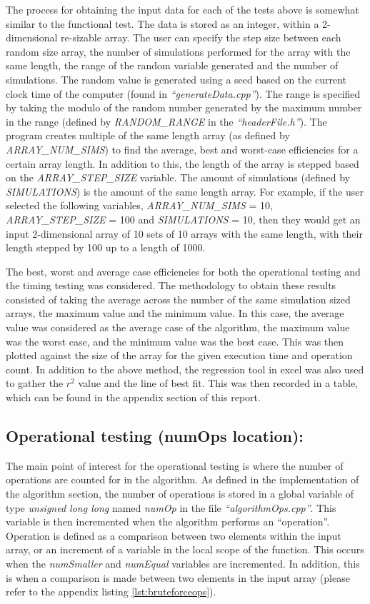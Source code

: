 \documentclass[12pt]{article}
\begin{document}
The process for obtaining the input data for each of the tests above is somewhat similar to the functional test. The data is stored as an integer, within a 2-dimensional re-sizable array. The user can specify the step size between each random size array, the number of simulations performed for the array with the same length, the range of the random variable generated and the number of simulations. The random value is generated using a seed based on the current clock time of the computer (found in \textit{“generateData.cpp”}). The range is specified by taking the modulo of the random number generated by the maximum number in the range (defined by \textit{RANDOM\_RANGE} in the \textit{“headerFile.h”}). The program creates multiple of the same length array (as defined by \textit{ARRAY\_NUM\_SIMS}) to find the average, best and worst-case efficiencies for a certain array length. In addition to this, the length of the array is stepped based on the \textit{ARRAY\_STEP\_SIZE} variable. The amount of simulations (defined by \textit{SIMULATIONS}) is the amount of the same length array. For example, if the user selected the following variables, \textit{ARRAY\_NUM\_SIMS} = 10, \textit{ARRAY\_STEP\_SIZE} = 100 and \textit{SIMULATIONS} = 10, then they would get an input 2-dimensional array of 10 sets of 10 arrays with the same length, with their length stepped by 100 up to a length of 1000.

The best, worst and average case efficiencies for both the operational testing and the timing testing was considered. The methodology to obtain these results consisted of taking the average across the number of the same simulation sized arrays, the maximum value and the minimum value. In this case, the average value was considered as the average case of the algorithm, the maximum value was the worst case, and the minimum value was the best case. This was then plotted against the size of the array for the given execution time and operation count. In addition to the above method, the regression tool in excel was also used to gather the $r^2$ value and the line of best fit. This was then recorded in a table, which can be found in the appendix section of this report. 

\subsection{Operational testing (numOps location):}
The main point of interest for the operational testing is where the number of operations are counted for in the algorithm. As defined in the implementation of the algorithm section, the number of operations is stored in a global variable of type \textit{unsigned long long} named \textit{numOp} in the file \textit{“algorithmOps.cpp”}. This variable is then incremented when the algorithm performs an “operation”. Operation is defined as a comparison between two elements within the input array, or an increment of a variable in the local scope of the function. This occurs when the \textit{numSmaller} and \textit{numEqual} variables are incremented. In addition, this is when a comparison is made between two elements in the input array (please refer to the appendix listing \ref{lst:bruteforceops}).
\end{document}
